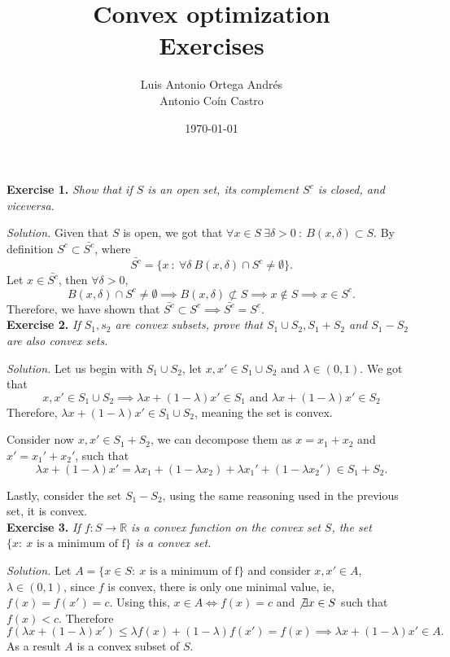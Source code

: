 \documentclass[11pt]{article}
\author{Luis Antonio Ortega Andrés\\Antonio Coín Castro}
\date{\today}
\title{Convex optimization \\ \Large Exercises}
\begin{document}
\maketitle


\textbf{Exercise 1. }\emph{Show that if \( S \) is an open set, its complement \( S^c \) is closed, and viceversa.}

\emph{Solution. } Given that \( S \) is open, we got that \( \forall x \in S \ \exists \delta > 0 \ : \ B(x, \delta) \subset S\). By definition \( S^c \subset \bar{S^c}\), where
\[
     \bar{S^c} =  \{x \ : \ \forall \delta\  B(x, \delta) \cap S^c \neq \emptyset \}.
\]
Let \( x \in \bar{S^c} \), then \( \forall \delta > 0 \),
\[
     B(x, \delta) \cap S^c \neq \emptyset \implies B(x, \delta) \not \subset S \implies x \notin S \implies x \in S^c.
\] 
Therefore, we have shown that \( \bar{S^c} \subset S^c \implies \bar{S^c} = S^c\).\\

\textbf{Exercise 2. }\emph{If \( S_1, s_2 \) are convex subsets, prove that \( S_1 \cup S_2, S_1 + S_2 \) and \( S_1 - S_2 \)  are also convex sets.}

\emph{Solution. } Let us begin with \( S_1 \cup S_2 \), let \( x, x' \in S_1 \cup S_2 \) and \( \lambda \in (0,1) \). We got that
\[
     x, x' \in S_1 \cup S_2 \implies  \lambda x + (1-\lambda)x' \in S_1 \text{ and } \lambda x + (1-\lambda)x' \in S_2
\] 
Therefore, \(  \lambda x + (1-\lambda)x' \in S_1 \cup S_2 \), meaning the set is convex. 

Consider now \( x, x' \in S_1 + S_2 \), we can decompose them as \(x = x_1 + x_2 \) and \( x' = x_1' + x_2' \), such that
\[
     \lambda x + (1-\lambda)x' = \lambda x_1 + (1-\lambda x_2) + \lambda x_1' + (1-\lambda x_2') \in S_1 + S_2.
\]

Lastly, consider the set \( S_1 - S_2 \), using the same reasoning used in the previous set, it is convex.\\

\textbf{Exercise 3. }\emph{If \( f: S \to \mathbb{R} \) is a convex function on the convex set \( S \), the set \( \{x : \ x \text{ is a minimum of f} \} \) is a convex set.}

\emph{Solution. } Let \( A = \{x \in S: \ x \text{ is a minimum of f} \} \) and consider \( x, x' \in A \), \( \lambda \in (0,1) \), since \( f \) is convex, there is only one minimal value, ie, \( f(x) = f(x') = c \). Using this, \( x\in A \iff f(x) = c \) and \( \not\exists x \in S \) such that \( f(x) < c \). Therefore
\[
    f(\lambda x + (1-\lambda)x') \leq \lambda f(x) + (1-\lambda)f(x') = f(x) \implies \lambda x + (1-\lambda)x' \in A.
\]
As a result \( A \) is a convex subset of \( S \).\\
\end{document}
